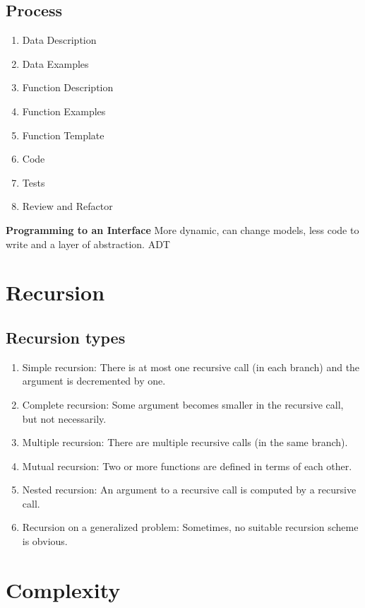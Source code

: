 \begin{multicols}{2}
\subsection{Process}
\begin{enumerate}
\item  Data Description
\item  Data Examples
\item  Function Description
\item  Function Examples
\item  Function Template
\item  Code
\item  Tests
\item  Review and Refactor
\end{enumerate}

\noindent\textbf{Programming to an Interface}
More dynamic, can change models, less code to write and a layer of abstraction. ADT 


\section{Recursion}
\subsection{Recursion types}
\begin{enumerate}
\item Simple recursion: There is at most one recursive call (in each branch)
  and the argument is decremented by one.
\item Complete recursion: Some argument becomes smaller in the recursive call, but not necessarily.
\item Multiple recursion: There are multiple recursive calls (in the same branch).
\item Mutual recursion: Two or more functions are defined in terms of each other.
\item Nested recursion: An argument to a recursive call is computed by a recursive call.
\item Recursion on a generalized problem: Sometimes, no suitable recursion scheme is obvious.
\end{enumerate}


\section{Complexity}

\end{multicols}

